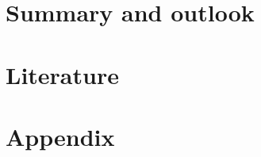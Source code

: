 \documentclass[a4paper,10pt,twoside]{article}
\begin{document}
	\section{Summary and outlook}
		
	\clearpage
		
	\section{Literature}

		
		
		
	\section{Appendix}
\end{document}
